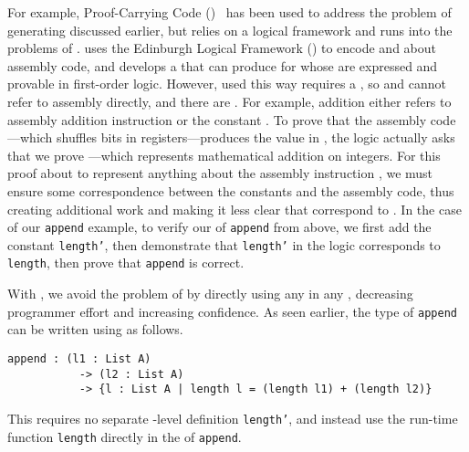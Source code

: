 For example, Proof-Carrying Code ()~\cite{necula1997} has been used
to address the problem of generating  
discussed earlier, but relies on a logical framework and runs into the
problems of .
\citet{necula1997} uses the Edinburgh Logical Framework () to encode
 and  about assembly code, and develops a
 that can produce  for 
whose  are expressed and provable in first-order logic.
However,  used this way requires a ,
so  and  cannot refer to assembly directly,
and there are .
For example, addition either refers to assembly addition instruction 
or the  constant \code{+}.
To prove that the assembly code ---which shuffles bits in
registers---produces the value  in , the logic actually asks
that we prove ---which represents mathematical addition on
integers.
For this proof about  to represent anything about the assembly
instruction , we must ensure some correspondence between the 
constants and the assembly code, thus creating additional work and making it
less clear that  correspond to .
In the case of our \texttt{append} example, to verify our
 of \texttt{append} from above, we first add the
 constant \texttt{length'}, then demonstrate that
\texttt{length'} in the logic corresponds to
\texttt{length}, then prove that \texttt{append} is correct.

With  , we avoid the problem of
 by directly using any  in any , decreasing
programmer effort and increasing confidence.
As seen earlier, the type of \texttt{append} can be written using
  as follows.
\begin{verbatim}
append : (l1 : List A)
           -> (l2 : List A)
           -> {l : List A | length l = (length l1) + (length l2)}
\end{verbatim}
This requires no separate -level definition
\texttt{length'}, and instead use the run-time function
\texttt{length} directly in the  of
\texttt{append}.

